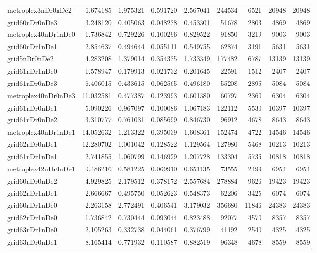 \documentclass[../../../thesis.tex]{subfiles}
\begin{document}
\begin{longtable}{|l|r|r|r|r|r|r|r|r|}
metroplex3nDr0nDe2 & 6.674185 & 1.975321 & 0.591720 & 2.567041 & 244534 & 6521 & 20948 & 20948 \\
grid60nDr0nDe3 & 3.248120 & 0.405063 & 0.048238 & 0.453301 & 51678 & 2803 & 4869 & 4869 \\
metroplex40nDr1nDe0 & 1.736842 & 0.729226 & 0.100296 & 0.829522 & 91850 & 3219 & 9003 & 9003 \\
grid60nDr1nDe1 & 2.854637 & 0.494644 & 0.055111 & 0.549755 & 62874 & 3191 & 5631 & 5631 \\
grid5nDr0nDe2 & 4.283208 & 1.379014 & 0.354335 & 1.733349 & 177482 & 6787 & 13139 & 13139 \\
grid61nDr1nDe0 & 1.578947 & 0.179913 & 0.021732 & 0.201645 & 22591 & 1512 & 2407 & 2407 \\
grid61nDr0nDe3 & 6.406015 & 0.433615 & 0.062565 & 0.496180 & 55208 & 2895 & 5084 & 5084 \\
metroplex40nDr0nDe3 & 11.032581 & 0.477387 & 0.123993 & 0.601380 & 60797 & 2360 & 6304 & 6304 \\
grid61nDr0nDe1 & 5.090226 & 0.967097 & 0.100086 & 1.067183 & 122112 & 5530 & 10397 & 10397 \\
grid61nDr0nDe2 & 3.310777 & 0.761031 & 0.085699 & 0.846730 & 96912 & 4678 & 8643 & 8643 \\
metroplex40nDr1nDe1 & 14.052632 & 1.213322 & 0.395039 & 1.608361 & 152474 & 4722 & 14546 & 14546 \\
grid62nDr0nDe1 & 12.280702 & 1.001042 & 0.128522 & 1.129564 & 127980 & 5468 & 10213 & 10213 \\
grid61nDr1nDe1 & 2.741855 & 1.060799 & 0.146929 & 1.207728 & 133304 & 5735 & 10818 & 10818 \\
metroplex42nDr0nDe1 & 9.486216 & 0.581225 & 0.069910 & 0.651135 & 73555 & 2499 & 6954 & 6954 \\
grid60nDr0nDe2 & 4.929825 & 2.179512 & 0.378172 & 2.557684 & 278884 & 9626 & 19423 & 19423 \\
grid62nDr1nDe1 & 2.666667 & 0.495750 & 0.052623 & 0.548373 & 62206 & 3425 & 6074 & 6074 \\
grid60nDr1nDe0 & 2.263158 & 2.772491 & 0.406541 & 3.179032 & 356680 & 11846 & 24383 & 24383 \\
grid62nDr1nDe0 & 1.736842 & 0.730444 & 0.093044 & 0.823488 & 92077 & 4570 & 8357 & 8357 \\
grid63nDr1nDe0 & 2.105263 & 0.332738 & 0.044061 & 0.376799 & 41192 & 2540 & 4325 & 4325 \\
grid63nDr0nDe1 & 8.165414 & 0.771932 & 0.110587 & 0.882519 & 96348 & 4678 & 8559 & 8559 \\

\end{longtable}
\end{document}
